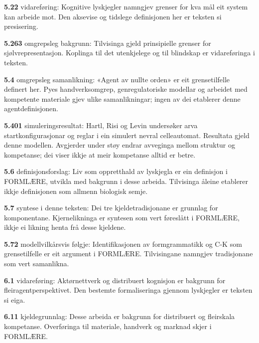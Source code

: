 \begin{widebody}
\noindent\hypertarget{kjeldenotat-5.22}{}\textbf{5.22} vidareføring: Kognitive lyskjegler namngjev grenser for kva mål eit system kan arbeide mot. Den aksevise og tidslege definisjonen her er teksten si presisering.\par\medskip
\noindent\hypertarget{kjeldenotat-5.263}{}\textbf{5.263} omgrepsleg bakgrunn: Tilvisinga gjeld prinsipielle grenser for sjølvrepresentasjon. Koplinga til det utenkjelege og til blindskap er vidareføringa i teksten.\par\medskip
\noindent\hypertarget{kjeldenotat-5.4}{}\textbf{5.4} omgrepsleg samanlikning: «Agent av nullte orden» er eit grensetilfelle definert her. Pyes handverksomgrep, genregulatoriske modellar og arbeidet med kompetente materiale gjev ulike samanlikningar; ingen av dei etablerer denne agentdefinisjonen.\par\medskip
\noindent\hypertarget{kjeldenotat-5.401}{}\textbf{5.401} simuleringsresultat: Hartl, Risi og Levin undersøker arva startkonfigurasjonar og reglar i ein simulert nevral celleautomat. Resultata gjeld denne modellen. Avgjerder under støy endrar avveginga mellom struktur og kompetanse; dei viser ikkje at meir kompetanse alltid er betre.\par\medskip
\noindent\hypertarget{kjeldenotat-5.6}{}\textbf{5.6} definisjonsforslag: Liv som oppretthald av lyskjegla er ein definisjon i FORMLÆRE, utvikla med bakgrunn i desse arbeida. Tilvisinga åleine etablerer ikkje definisjonen som allmenn biologisk semje.\par\medskip
\noindent\hypertarget{kjeldenotat-5.7}{}\textbf{5.7} syntese i denne teksten: Dei tre kjeldetradisjonane er grunnlag for komponentane. Kjernelikninga er syntesen som vert føreslått i FORMLÆRE, ikkje ei likning henta frå desse kjeldene.\par\medskip
\noindent\hypertarget{kjeldenotat-5.72}{}\textbf{5.72} modellvilkårsvis følgje: Identifikasjonen av formgrammatikk og C-K som grensetilfelle er eit argument i FORMLÆRE. Tilvisingane namngjev tradisjonane som vert samanlikna.\par\medskip
\noindent\hypertarget{kjeldenotat-6.1}{}\textbf{6.1} vidareføring: Aktørnettverk og distribuert kognisjon er bakgrunn for fleiragentperspektivet. Den bestemte formaliseringa gjennom lyskjegler er teksten si eiga.\par\medskip
\noindent\hypertarget{kjeldenotat-6.11}{}\textbf{6.11} kjeldegrunnlag: Desse arbeida er bakgrunn for distribuert og fleirskala kompetanse. Overføringa til materiale, handverk og marknad skjer i FORMLÆRE.\par\medskip

\end{widebody}

